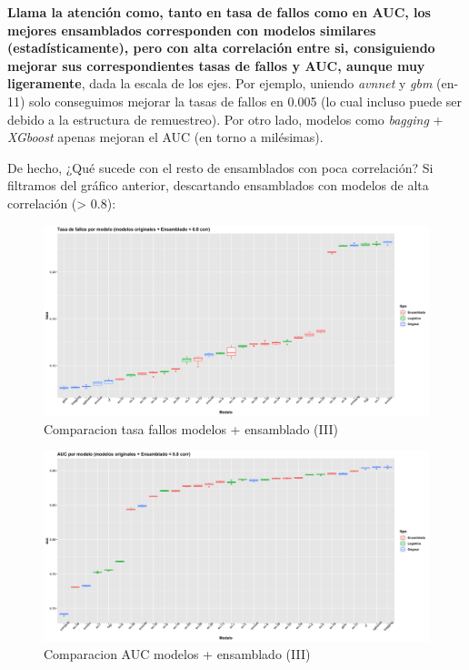 \documentclass[
]{article}
\begin{document}
\textbf{Llama la atención como, tanto en tasa de fallos como en AUC, los
mejores ensamblados corresponden con modelos similares
(estadísticamente), pero con alta correlación entre si, consiguiendo
mejorar sus correspondientes tasas de fallos y AUC, aunque muy
ligeramente}, dada la escala de los ejes. Por ejemplo, uniendo
\emph{avnnet} y \emph{gbm} (en-11) solo conseguimos mejorar la tasas de
fallos en 0.005 (lo cual incluso puede ser debido a la estructura de
remuestreo). Por otro lado, modelos como \emph{bagging} + \emph{XGboost}
apenas mejoran el AUC (en torno a milésimas).

De hecho, ¿Qué sucede con el resto de ensamblados con poca correlación?
Si filtramos del gráfico anterior, descartando ensamblados con modelos
de alta correlación (\textgreater{} 0.8):

\begin{figure}[h!]

{\centering \includegraphics[width=0.99\linewidth,height=0.99\textheight,]{./charts/ensamblado_tasa_fallos_1_corr08} 

}

\caption{Comparacion tasa fallos modelos + ensamblado (III)}\label{fig:unnamed-chunk-145}
\end{figure}
\begin{figure}[h!]

{\centering \includegraphics[width=0.99\linewidth,height=0.99\textheight,]{./charts/ensamblado_auc_1_corr08} 

}

\caption{Comparacion AUC modelos + ensamblado (III)}\label{fig:unnamed-chunk-146}
\end{figure}
\end{document}
